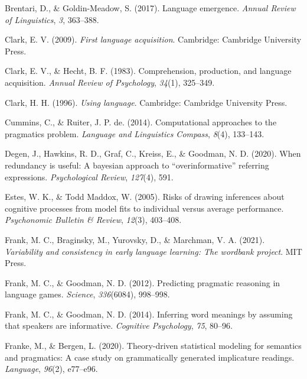\documentclass[
  man,floatsintext]{apa6}
\newlength{\cslhangindent}
\newlength{\cslentryspacingunit} %
\newenvironment{CSLReferences}[2] %
 {%
  \setlength{\parindent}{0pt}
  \ifodd #1
  \let\oldpar\par
  \def\par{\hangindent=\cslhangindent\oldpar}
  \fi
  \setlength{\parskip}{#2\cslentryspacingunit}
 }%
 {}
\begin{document}
\begin{CSLReferences}{1}{0}
\leavevmode{}%
Brentari, D., \& Goldin-Meadow, S. (2017). Language emergence. \emph{Annual Review of Linguistics}, \emph{3}, 363--388.

\leavevmode{}%
Clark, E. V. (2009). \emph{First language acquisition}. Cambridge: Cambridge University Press.

\leavevmode{}%
Clark, E. V., \& Hecht, B. F. (1983). Comprehension, production, and language acquisition. \emph{Annual Review of Psychology}, \emph{34}(1), 325--349.

\leavevmode{}%
Clark, H. H. (1996). \emph{Using language}. Cambridge: Cambridge University Press.

\leavevmode{}%
Cummins, C., \& Ruiter, J. P. de. (2014). Computational approaches to the pragmatics problem. \emph{Language and Linguistics Compass}, \emph{8}(4), 133--143.

\leavevmode{}%
Degen, J., Hawkins, R. D., Graf, C., Kreiss, E., \& Goodman, N. D. (2020). When redundancy is useful: A bayesian approach to {``overinformative''} referring expressions. \emph{Psychological Review}, \emph{127}(4), 591.

\leavevmode{}%
Estes, W. K., \& Todd Maddox, W. (2005). Risks of drawing inferences about cognitive processes from model fits to individual versus average performance. \emph{Psychonomic Bulletin \& Review}, \emph{12}(3), 403--408.

\leavevmode{}%
Frank, M. C., Braginsky, M., Yurovsky, D., \& Marchman, V. A. (2021). \emph{Variability and consistency in early language learning: The wordbank project}. MIT Press.

\leavevmode{}%
Frank, M. C., \& Goodman, N. D. (2012). Predicting pragmatic reasoning in language games. \emph{Science}, \emph{336}(6084), 998--998.

\leavevmode{}%
Frank, M. C., \& Goodman, N. D. (2014). Inferring word meanings by assuming that speakers are informative. \emph{Cognitive Psychology}, \emph{75}, 80--96.

\leavevmode{}%
Franke, M., \& Bergen, L. (2020). Theory-driven statistical modeling for semantics and pragmatics: A case study on grammatically generated implicature readings. \emph{Language}, \emph{96}(2), e77--e96.


\end{CSLReferences}
\end{document}
